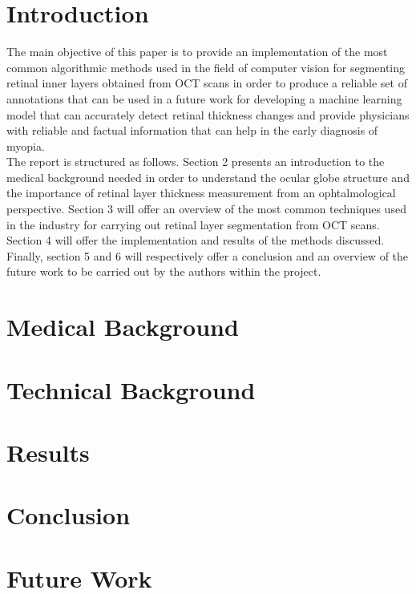 \documentclass[12pt,a4paper]{scrartcl}
\begin{document}
\newpage
{}

\section{Introduction}\label{s:introduction}
The main objective of this paper is to provide an implementation of the most common algorithmic methods used in the field of computer vision for segmenting retinal inner layers obtained from OCT scans in order to produce a reliable set of annotations that can be used in a future work for developing a machine learning model that can accurately detect retinal thickness changes and provide physicians with reliable and factual information that can help in the early diagnosis of myopia. \\

The report is structured as follows. Section 2 presents an introduction to the medical background needed in order to understand the ocular globe structure and the importance of retinal layer thickness measurement from an ophtalmological perspective. Section 3 will offer an overview of the most common techniques used in the industry for carrying out retinal layer segmentation from OCT scans. Section 4 will offer the implementation and results of the methods discussed. Finally, section 5 and 6 will respectively offer a conclusion and an overview of the future work to be carried out by the authors within the project.  

\section{Medical Background}\label{s:medical_background}

\section{Technical Background}
\section{Results}
\section{Conclusion}
\section{Future Work}
\end{document}
